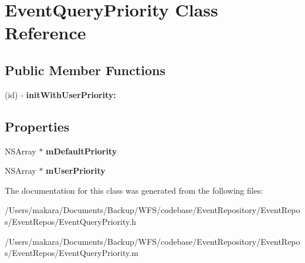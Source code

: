 \hypertarget{interface_event_query_priority}{
\section{\-Event\-Query\-Priority \-Class \-Reference}
\label{interface_event_query_priority}
}
\subsection*{\-Public \-Member \-Functions}
\begin{DoxyCompactItemize}
\item 
\hypertarget{interface_event_query_priority_a6e719e743439d7adb2e31cbd0e78e7a6}{
(id) -\/ {\bfseries init\-With\-User\-Priority\-:}}
\label{interface_event_query_priority_a6e719e743439d7adb2e31cbd0e78e7a6}

\end{DoxyCompactItemize}
\subsection*{\-Properties}
\begin{DoxyCompactItemize}
\item 
\hypertarget{interface_event_query_priority_ae38bb290d37af729f7760c8b4c78d403}{
\-N\-S\-Array $\ast$ {\bfseries m\-Default\-Priority}}
\label{interface_event_query_priority_ae38bb290d37af729f7760c8b4c78d403}

\item 
\hypertarget{interface_event_query_priority_a143394fdae8304f54cad689313b2756f}{
\-N\-S\-Array $\ast$ {\bfseries m\-User\-Priority}}
\label{interface_event_query_priority_a143394fdae8304f54cad689313b2756f}

\end{DoxyCompactItemize}


\-The documentation for this class was generated from the following files\-:\begin{DoxyCompactItemize}
\item 
/\-Users/makara/\-Documents/\-Backup/\-W\-F\-S/codebase/\-Event\-Repository/\-Event\-Repos/\-Event\-Repos/\-Event\-Query\-Priority.\-h\item 
/\-Users/makara/\-Documents/\-Backup/\-W\-F\-S/codebase/\-Event\-Repository/\-Event\-Repos/\-Event\-Repos/\-Event\-Query\-Priority.\-m\end{DoxyCompactItemize}
